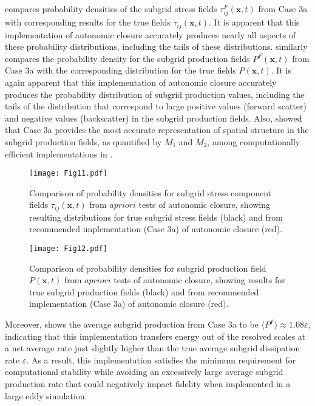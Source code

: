  compares probability densities of the subgrid stress fields $\tau_{ij}^{F}(\mathbf{x},t)$  from Case 3a with corresponding results for the true fields $\tau_{ij}(\mathbf{x},t)$. It is apparent that this implementation of autonomic closure accurately produces nearly all aspects of these probability distributions, including the tails of these distributions.  similarly compares the probability density for the subgrid production fields $P^{F}(\mathbf{x},t)$  from Case 3a with the corresponding distribution for the true fields $P(\mathbf{x},t)$. It is again apparent that this implementation of autonomic closure accurately produces the probability distribution of subgrid production values, including the tails of the distribution that correspond to large positive values (forward scatter) and negative values (backscatter) in the subgrid production fields. Also,  showed that Case 3a provides the most accurate representation of spatial structure in the subgrid production fields, as quantified by  $M_1$ and $M_2$, among computationally efficient implementations in . 

%
\begin{figure}
	\begin{center}
	\texttt{[image: Fig11.pdf]}
	\caption{Comparison of probability densities for subgrid stress component fields $\tau_{ij}(\mathbf{x},t)$ from $a priori$ tests of autonomic closure, showing resulting distributions for true subgrid stress fields (black) and from recommended implementation (Case 3a) of autonomic closure (red).}
	\label{F:11}
	\end{center}
\end{figure}
%
%
%
\begin{figure}
	\begin{center}
	\texttt{[image: Fig12.pdf]}
	\caption{Comparison of probability densities for subgrid production field $P(\mathbf{x},t)$ from $a priori$ tests of autonomic closure, showing results for true subgrid production fields (black) and from recommended implementation (Case 3a) of autonomic closure (red).}
	\label{F:12}
	\end{center}
\end{figure}
%
%

Moreover,  shows the average subgrid production from Case 3a to be $\langle P^F \rangle \approx 1.08 \varepsilon$, indicating that this implementation transfers energy out of the resolved scales at a net average rate just slightly higher than the true average subgrid dissipation rate $\varepsilon$. As a result, this implementation satisfies the minimum requirement for computational stability while avoiding an excessively large average subgrid production rate that could negatively impact fidelity when implemented in a large eddy simulation.

